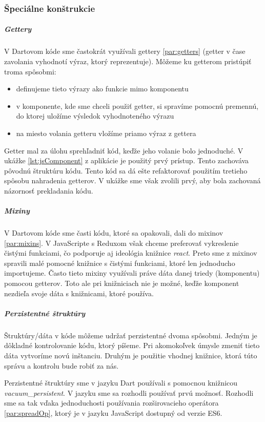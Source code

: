 

\subsubsection{Špeciálne konštrukcie}

\subparagraph{Gettery} \NEW{}
V Dartovom kóde sme častokrát využívali gettery \ref{par:getters} (getter v čase zavolania vyhodnotí výraz, ktorý reprezentuje). Môžeme ku getterom pristúpiť troma spôsobmi: 
\begin{itemize}
  \item definujeme tieto výrazy ako funkcie mimo komponentu
  \item v komponente, kde sme chceli použiť getter, si spravíme pomocnú premennú, do ktorej uložíme výsledok vyhodnoteného výrazu
  \item na miesto volania getteru vložíme priamo výraz z gettera
\end{itemize}

Getter mal za úlohu sprehľadniť kód, keďže jeho volanie bolo jednoduché.
V ukážke \ref{lst:jsComponent} z aplikácie je použitý prvý prístup. Tento zachováva pôvodnú štruktúru kódu. Tento kód sa dá ešte refaktorovať použitím tretieho spôsobu nahradenia getterov. V ukážke sme však zvolili prvý, aby bola zachovaná názornosť prekladania kódu.

\subparagraph{Mixiny}
V Dartovom kóde sme časti kódu, ktoré sa opakovali, dali do mixinov \ref{par:mixins}. V JavaScripte s Reduxom však chceme preferovať vykreslenie čistými funkciami, čo podporuje aj ideológia knižnice \emph{react}. Preto sme z mixinov spravili malé pomocné knižnice s čistými funkciami, ktoré len jednoducho importujeme. Často tieto mixiny využívali práve dáta danej triedy (komponentu) pomocou getterov. Toto ale pri knižniciach nie je možné, keďže komponent nezdieľa svoje dáta s knižnicami, ktoré používa.

\subparagraph{Perzistentné štruktúry} \NEW{}
Štruktúry/dáta v kóde môžeme udržať perzistentné dvoma spôsobmi. 
Jedným je dôkladné kontrolovanie kódu, ktorý píšeme. Pri akomokoľvek úmysle zmeniť tieto dáta vytvoríme novú inštanciu.
Druhým je použitie vhodnej knižnice, ktorá túto správu a kontrolu bude robiť za nás.

Perzistentné štruktúry sme v jazyku Dart používali s pomocnou knižnicou \emph{vacuum\_persistent}. V jazyku \JS{} sme sa rozhodli používať prvú možnosť. Rozhodli sme sa tak vďaka jednoduchosti používania rozširovacieho operátora \ref{par:spreadOp}, ktorý je v jazyku JavaScript dostupný od verzie ES6.

